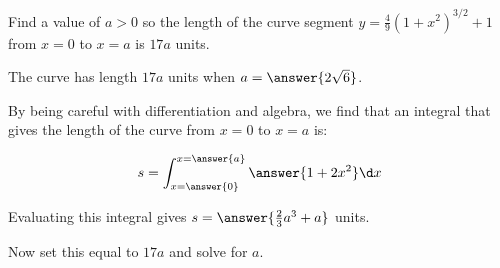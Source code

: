 \documentclass{ximera}
\author{Jim Talamo}
\begin{document}
\begin{exercise}

Find a value of $a>0$ so the length of the curve segment $y=\frac{4}{9}\left(1+x^2\right)^{3/2} +1$ from $x=0$ to $x=a$ is $17a$ units.



The curve has length $17a$ units when $a=\answer{2\sqrt{6}}$.

\begin{hint}
By being careful with differentiation and algebra, we find that an integral that gives the length of the curve from $x=0$ to $x=a$ is:

\[
s= \int_{x=\answer{0}}^{x=\answer{a}} \answer{ 1+2x^2} \d x
\]

Evaluating this integral gives $s = \answer{\frac{2}{3}a^3+a}$ units.

Now set this equal to $17a$ and solve for $a$.
\end{hint}

\end{exercise}
\end{document}
